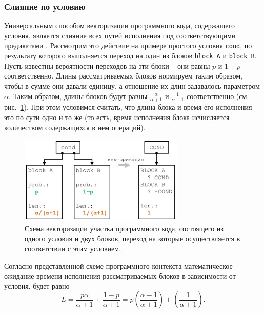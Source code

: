 \subsubsection{Слияние по условию}\label{sec:text_4_vec_mrg_under_cond}

Универсальным способом векторизации программного кода, содержащего условия, является слияние всех путей исполнения под соответствующими предикатами \cite{Rybakov2024VecComb}.
Рассмотрим это действие на примере простого условия \texttt{cond}, по результату которого выполняется переход на один из блоков \texttt{block A} и \texttt{block B}.
Пусть известны вероятности переходов на эти блоки -- они равны $p$ и $1 - p$ соответственно.
Длины рассматриваемых блоков нормируем таким образом, чтобы в сумме они давали единицу, а отношение их длин задавалось параметром $\alpha$.
Таким образом, длины блоков будут равны $\frac{\alpha}{\alpha + 1}$ и $\frac{1}{\alpha + 1}$ соответственно (см. рис.~\ref{fig:text_4_vec_mrg_under_cond_cond}).
При этом условимся считать, что длина блока и время его исполнения это по сути одно и то же (то есть, время исполнения блока исчисляется количеством содержащихся в нем операций).

\begin{figure}[ht]
\centering
\includegraphics[width=0.7\textwidth]{./fig/vec_ifconv_nocheck.pdf}
\singlespacing
{}\caption{Схема векторизации участка программного кода, состоящего из одного условия и двух блоков, переход на которые осуществляется в соответствии с этим условием.}
\label{fig:text_4_vec_mrg_under_cond_cond}
\end{figure}

Согласно представленной схеме программного контекста математическое ожидание времени исполнения рассматриваемых блоков в зависимости от условия, будет равно
\begin{equation}\label{eqn:text_4_vec_mrg_under_cond_t1}
	L = \frac{p \alpha}{\alpha + 1} + \frac{1 - p}{\alpha + 1} = p\left(\frac{\alpha - 1}{\alpha + 1}\right) + \left(\frac{1}{\alpha + 1}\right).
\end{equation}

